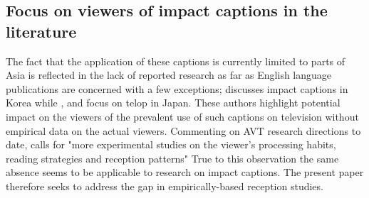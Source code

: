 \documentclass[output=paper]{langsci/langscibook}
\begin{document}
\subsection{Focus on viewers of impact captions in the literature}

The fact that the application of these captions is currently limited to parts of Asia is reflected in the lack of reported research as far as English language publications are concerned with a few exceptions; \citet{Park2009} discusses impact captions in Korea while \citet{ohagan2010}, \citet{Sasamoto2014} and \citet{maree2015} focus on telop in Japan. These authors highlight potential impact on the viewers of the prevalent use of such captions on television without empirical data on the actual viewers. Commenting on AVT research directions to date, \citet[pg. 57]{gambier2013} calls for "more experimental studies on the viewer's processing habits, reading strategies and reception patterns" True to this observation the same absence seems to be applicable to research on impact captions. The present paper therefore seeks to address the gap in empirically-based reception studies.
\end{document}
